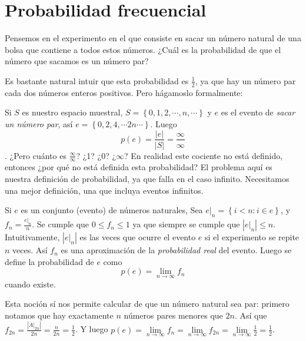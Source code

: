 \documentclass[spanish]{report}
\newcommand{\card}[1]{\left|#1 \right|}
\begin{document}
\section{Probabilidad frecuencial}

Pensemos en el experimento en el que consiste en sacar un número natural de una bolsa que contiene a todos estos números. ¿Cuál es la probabilidad de que el número que sacamos es un número par?

Es bastante natural intuir que esta probabilidad es $\frac{1}{2}$, ya que hay un número par cada dos números enteros positivos. Pero hágamoslo formalmente:

Si $S$ es nuestro espacio muestral, $S= \left\lbrace 0, 1, 2, \cdots, n, \cdots \right\rbrace$ y $e$ es el evento de \emph{sacar un número par}, así $e= \left\lbrace 0, 2, 4, \cdots 2n \cdots \right\rbrace$. Luego \[p(e) = \frac{\card{e}}{\card{S}} = \frac{\infty}{\infty} \].
¿Pero cuánto es $\frac{\infty}{\infty}$? ¿1? ¿0? ¿$\infty$?
En realidad este cociente no está definido, entonces ¿por qué no está definida esta probabilidad? El problema aquí es nuestra definición de probabilidad, %
ya que falla en el caso infinito. Necesitamos una mejor definición, una que incluya eventos infinitos.

Si $e$ es un conjunto (evento) de números naturales, Sea $e|_n = \left\lbrace i < n : i \in e \right\rbrace$, y $f_n = \frac{e|_n}{n}$. Se cumple que $0 \leq f_n \leq 1$ ya que siempre se cumple que $\card{e|_n} \leq n$.
Intuitivamente, $\card{e|_n}$ es las veces que ocurre el evento $e$ si el experimento se repite $n$ veces. Así $f_n$ es una aproximación de la \emph{probabilidad real} del evento.
Luego se define la probabilidad de $e$ como \[p(e) = \lim\limits_{n \to \infty} f_n\] cuando existe.

Esta noción sí nos permite calcular de que un número natural sea par:
primero notamos que hay exactamente $n$ números pares menores que $2n$. Así que $f_{2n}= \frac{\card{A|_{2n}}}{2n}=\frac{n}{2n}=\frac{1}{2}$.
Y luego $p(e) = \lim\limits_{n \to \infty} f_n = \lim\limits_{n \to \infty} f_{2n}= \lim\limits_{n \to \infty}\frac{1}{2} = \frac{1}{2}$.
\end{document}
